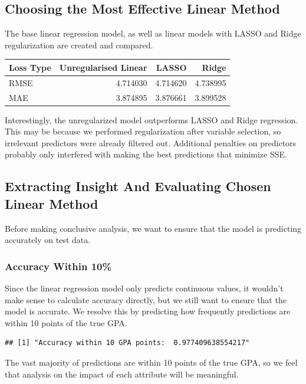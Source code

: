 \documentclass[
]{article}
\begin{document}
\subsection{Choosing the Most Effective Linear
Method}\label{choosing-the-most-effective-linear-method}

The base linear regression model, as well as linear models with LASSO
and Ridge regularization are created and compared.

\begin{longtable}[]{@{}lrrr@{}}
\toprule\noalign{}
Loss Type & Unregularised Linear & LASSO & Ridge \\
\midrule\noalign{}
\endhead
\bottomrule\noalign{}
\endlastfoot
RMSE & 4.714030 & 4.714620 & 4.738995 \\
MAE & 3.874895 & 3.876661 & 3.899528 \\
\end{longtable}

Interestingly, the unregularized model outperforms LASSO and Ridge
regression. This may be because we performed regularization after
variable selection, so irrelevant predictors were already filtered out.
Additional penalties on predictors probably only interfered with making
the best predictions that minimize SSE.

\subsection{Extracting Insight And Evaluating Chosen Linear
Method}\label{extracting-insight-and-evaluating-chosen-linear-method}

Before making conclusive analysis, we want to ensure that the model is
predicting accurately on test data.

\subsubsection{Accuracy Within 10\%}\label{accuracy-within-10}

Since the linear regression model only predicts continuous values, it
wouldn't make sense to calculate accuracy directly, but we still want to
ensure that the model is accurate. We resolve this by predicting how
frequently predictions are within 10 points of the true GPA.

\begin{verbatim}
## [1] "Accuracy within 10 GPA points:  0.977409638554217"
\end{verbatim}

The vast majority of predictions are within 10 points of the true GPA,
so we feel that analysis on the impact of each attribute will be
meaningful.
\end{document}
